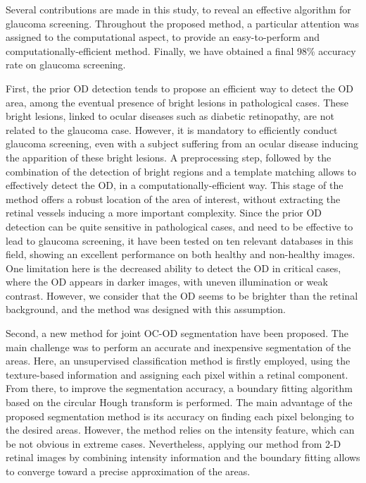Several contributions are made in this study, to reveal an effective algorithm for glaucoma screening. Throughout the proposed method, a particular attention was assigned to the computational aspect, to provide an easy-to-perform and computationally-efficient method. Finally, we have obtained a final 98\% accuracy rate on glaucoma screening.

First, the prior OD detection tends to propose an efficient way to detect the OD area, among the eventual presence of bright lesions in pathological cases. These bright lesions, linked to ocular diseases such as diabetic retinopathy, are not related to the glaucoma case. However, it is mandatory to efficiently conduct glaucoma screening, even with a subject suffering from an ocular disease inducing the apparition of these bright lesions. A preprocessing step, followed by the combination of the detection of bright regions and a template matching allows to effectively detect the OD, in a computationally-efficient way. This stage of the method offers a robust location of the area of interest, without extracting the retinal vessels inducing a more important complexity.
Since the prior OD detection can be quite sensitive in pathological cases, and need to be effective to lead to glaucoma screening, it have been tested on ten relevant databases in this field, showing an excellent performance on both healthy and non-healthy images.
One limitation here is the decreased ability to detect the OD in critical cases, where the OD appears in darker images, with uneven illumination or weak contrast. However, we consider that the OD seems to be brighter than the retinal background, and the method was designed with this assumption.

Second, a new method for joint OC-OD segmentation have been proposed. The main challenge was to perform an accurate and inexpensive segmentation of the areas. Here, an unsupervised classification method is firstly employed, using the texture-based information and assigning each pixel within a retinal component. From there, to improve the segmentation accuracy, a boundary fitting algorithm based on the circular Hough transform is performed. The main advantage of the proposed segmentation method is its accuracy on finding each pixel belonging to the desired areas. However, the method relies on the intensity feature, which can be not obvious in extreme cases. Nevertheless, applying our method from 2-D retinal images by combining intensity information and the boundary fitting allows to converge toward a precise approximation of the areas.

